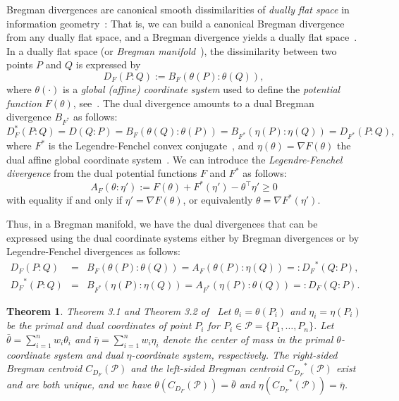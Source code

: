 \documentclass[11pt]{article}
\newtheorem{theorem}{Theorem}
\def\calP{\mathcal{P}}
\def\eqdef{:=}
\begin{document}
Bregman divergences are canonical smooth dissimilarities of {\em dually flat space} in information geometry~\cite{IG-2016,EIG-2018}:
That is,  we can build a canonical Bregman divergence from any dually flat space, and a Bregman divergence yields a dually flat space~\cite{IGDiv-2010}.
In a dually flat space (or {\em Bregman manifold}~\cite{GeodesicTriangles-2019}), the dissimilarity between two points $P$ and $Q$ is expressed by
\begin{equation}
D_F(P:Q)\eqdef B_F(\theta(P):\theta(Q)), 
\end{equation}
where $\theta(\cdot)$ is a {\em global (affine) coordinate system} used to define the {\em potential function} $F(\theta)$, see~\cite{IG-2016,EIG-2018}.
The dual divergence amounts to a dual Bregman divergence $B_{F^*}$ as follows:
\begin{equation}
D^*_F(P:Q)= D(Q:P)=B_F(\theta(Q):\theta(P)) = B_{F^*}(\eta(P):\eta(Q)) = D_{F^*}(P:Q), 
\end{equation}
where $F^*$ is the Legendre-Fenchel convex conjugate~\cite{GeodesicTriangles-2019}, and $\eta(\theta)=\nabla F(\theta)$ the dual affine global coordinate system~\cite{IG-2016,EIG-2018}.
We can introduce the {\em Legendre-Fenchel divergence} from the dual potential functions $F$ and $F^*$ as follows:
\begin{equation}
A_F(\theta:\eta')\eqdef F(\theta)+F^*(\eta')-\theta^\top\eta'\geq 0
\end{equation}
with equality if and only if $\eta'=\nabla F(\theta)$, or equivalently $\theta=\nabla F^*(\eta')$.

Thus, in a Bregman manifold, we have the dual divergences that can be expressed using the dual coordinate systems either by Bregman divergences or by Legendre-Fenchel divergences as follows:
\begin{eqnarray}
D_F(P:Q) &=&  B_F(\theta(P):\theta(Q)) = A_{F}(\theta(P):\eta(Q)) =: {D_F}^*(Q:P),\\
{D_F}^*(P:Q) &=& B_{F^*}(\eta(P):\eta(Q)) = A_{F^*}(\eta(P):\theta(Q))=: D_F(Q:P).
\end{eqnarray}


\begin{theorem}{Theorem 3.1 and Theorem 3.2 of~\cite{SBD-2009}}
Let $\theta_i=\theta(P_i)$ and $\eta_i=\eta(P_i)$ be the primal and dual coordinates of point $P_i$ for $P_i\in\calP=\{P_1,\ldots,P_n\}$.
Let $\bar\theta=\sum_{i=1}^n w_i \theta_i$ and $\bar\eta=\sum_{i=1}^n w_i \eta_i$ denote the center of mass in the primal $\theta$-coordinate system and dual $\eta$-coordinate system, respectively.
The right-sided Bregman centroid $C_{D_F}(\calP)$ and  the left-sided Bregman centroid ${C_{D_F}}^*(\calP)$ exist and are both unique, 
and we have $\theta(C_{D_F}(\calP))=\bar{\theta}$ and $\eta({C_{D_F}}^*(\calP))=\bar\eta$.
\end{theorem}
\end{document}
